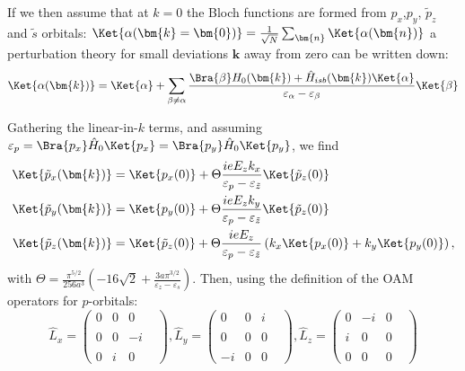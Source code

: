 If we then assume that at $k=0$ the Bloch functions are formed from $p_x$,$p_y$, $\tilde{p}_z$ and $\tilde{s}$ orbitals: $\Ket{\alpha(\bm{k}=\bm{0})} = \frac{1}{\sqrt{N}}\sum_{\bm{n}} \Ket{\alpha(\bm{n})}$  a perturbation theory for small deviations $\bm{k}$ away from zero can be written down:
\begin{equation}
	\Ket{\alpha(\bm{k})}=\Ket{\alpha} + \sum_{\beta \neq \alpha} \frac{\Bra{\beta} H_0(\bm{k}) + \hat{H}_{isb}(\bm{k}) \Ket{\alpha}}{\varepsilon_{\alpha} - \varepsilon_{\beta}} \Ket{\beta}
\end{equation}

Gathering the linear-in-$k$ terms, and assuming $\varepsilon_p = \Bra{p_x} \hat{H}_0 \Ket{p_x} = \Bra{p_y} \hat{H}_0 \Ket{p_y}$, we find
\begin{align}
	\Ket{\tilde{p}_x(\bm{k})} &= \Ket{p_x(0)} + \Theta \frac{ i e E_z k_x}{\varepsilon_p - \varepsilon_{\tilde{z}}}\Ket{\tilde{p}_z(0)} \\
	\Ket{\tilde{p}_y(\bm{k})} &= \Ket{p_y(0)} + \Theta \frac{ i e E_z k_y}{\varepsilon_p - \varepsilon_{\tilde{z}}}\Ket{\tilde{p}_z(0)}\\
	\Ket{\tilde{p}_z(\bm{k})} &= \Ket{\tilde{p}_z(0)} + \Theta \frac{i e E_z}{\varepsilon_p - \varepsilon_{\tilde{z}}} \left(k_x\Ket{p_x(0)} + k_y\Ket{p_y(0)}\right),
\end{align}
with $\Theta = \frac{\pi^{5/2}}{256 a^3 }\left(-16\sqrt{2} + \frac{3a\pi^{3/2}}{\varepsilon_z - \varepsilon_s}\right)$.
Then, using the definition of the OAM operators for $p$-orbitals:
\begin{equation}
	\hat{L}_x =\left(\begin{matrix}0&0&0\\\\0&0&-i\\\\0&i&0&\end{matrix}\right), \hat{L}_y =\left(\begin{matrix}0&0&i\\\\0&0&0\\\\-i&0&0&\end{matrix}\right), \hat{L}_z =\left(\begin{matrix}0&-i&0\\\\i&0&0\\\\0&0&0&\end{matrix}\right)
\end{equation}
